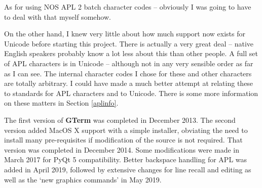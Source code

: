 \documentclass[a4paper,twoside,11pt]{article}
\newcommand{\newpara}{\par\vspace{4mm}\noindent}
\begin{document}
As for using NOS APL 2 batch character codes -- obviously I was going to have to deal with that
myself somehow.
\newpara
On the other hand, I knew very little about how much support now exists for Unicode before starting this project.
There is actually a very great deal -- native English speakers probably know a lot less about this than other people.
A full set of APL characters is in Unicode -- although not in any very sensible order as far as I can see. The
internal character codes I chose for these and other characters are totally arbitrary. I could have made a much
better attempt at relating these to standards for APL characters and to Unicode. There is some more information
on these matters in Section \ref{aplinfo}.
\newpara
The first version of \textbf{GTerm} was completed in December 2013. The second version added MacOS X support with a 
simple installer, obviating the need to install many pre-requisites if modification of the source is not required.
That version was completed in December 2014. Some modifications were made in March 2017 for PyQt 5 compatibility.
Better backspace handling for APL was added in April 2019, followed by extensive changes for line recall and editing
as well as the `new graphics commands' in May 2019.
\end{document}
